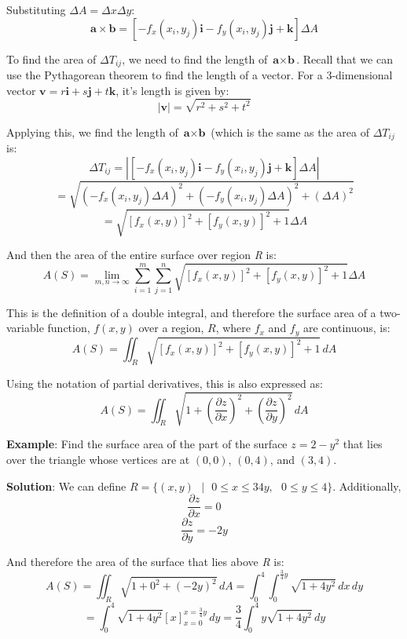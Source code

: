 Substituting $\Delta A = \Delta x \Delta y$:
$$\textbf{a} \times \textbf{b} = \left[ -f_x(x_i, y_j) \textbf{i} - f_y(x_i, 
y_j) \textbf{j} + \textbf{k} \right] \Delta A$$

To find the area of $\Delta T_{ij}$, we need to find the length of $\textbf{a} 
\times \textbf{b}$. Recall that we can use the Pythagorean theorem to find the 
length of a vector. For a 3-dimensional vector $\textbf{v} = r \textbf{i} + s 
\textbf{j} + t \textbf{k}$, it's length is given by:
$$|\textbf{v}| = \sqrt{r^2 + s^2 + t^2}$$

Applying this, we find the length of $\textbf{a} \times \textbf{b}$ (which is 
the same as the area of $\Delta T_{ij}$ is:
$$\Delta T_{ij} = |\left[ -f_x(x_i, y_j) \textbf{i} - f_y(x_i, y_j) \textbf{j} 
+ \textbf{k} \right] \Delta A|$$
$$= \sqrt{\left(-f_x(x_i, y_j) \Delta A \right)^2 + \left( - f_y(x_i, y_j) 
\Delta A \right)^2 + \left( \Delta A \right)^2}$$
$$= \sqrt{\left[ f_x(x, y)\right]^2 + \left[f_y(x, y) \right]^2 + 1} \Delta A$$

And then the area of the entire surface over region \textit{R} is:
$$A(S) = \lim_{m, n \to \infty} \sum_{i = 1}^m \sum_{j = 1}^n \sqrt{\left[ f_x(
x, y)\right]^2 + \left[f_y(x, y) \right]^2 + 1} \Delta A$$

This is the definition of a double integral, and therefore the surface area of 
a two-variable function, $f(x, y)$ over a region, $R$, where $f_x$ and $f_y$ 
are continuous, is:
$$A(S) = \iint_{\textit{R}} \sqrt{\left[ f_x(x, y)\right]^2 + \left[f_y(x, y) 
\right]^2 + 1}\,dA$$

Using the notation of partial derivatives, this is also expressed as:
$$A(S) = \iint_{\textit{R}} \sqrt{1 + \left( \frac{\partial z}{\partial x} 
\right)^2 + \left( \frac{\partial z}{\partial y} \right)^2}\,dA$$

\textbf{Example}: Find the surface area of the part of the surface $z = 2 - 
y^2$ that lies over the triangle whose vertices are at $(0, 0)$, $(0, 4)$, and 
$(3, 4)$. 

\textbf{Solution}: We can define $\textit{R} = \{(x, y)\text{ }|\text{ }0 \leq 
x \leq {3}{4}y,\text{ }0 \leq y \leq 4\}$. Additionally, 
$$\frac{\partial z}{\partial x} = 0$$
$$\frac{\partial z}{\partial y} = -2y$$

And therefore the area of the surface that lies above \textit{R} is:
$$A(S) = \iint_{\textit{R}} \sqrt{1 + 0^2 + \left( -2y \right)^2}\,dA = 
\int_0^4 \int_0^{\frac{3}{4}y} \sqrt{1 + 4y^2}\,dx\,dy$$
$$= \int_0^4 \sqrt{1 + 4y^2} \left[ x \right]_{x = 0}^{x = \frac{3}{4}y}\,dy 
= \frac{3}{4} \int_0^4 y \sqrt{1 + 4y^2}\,dy$$

